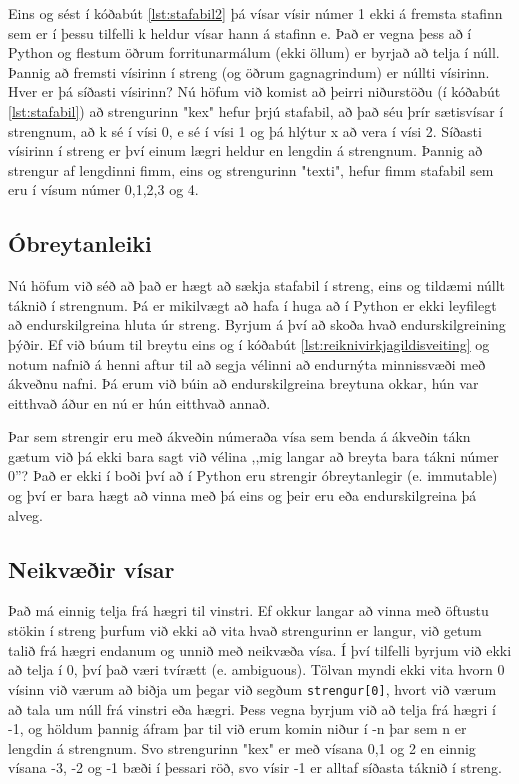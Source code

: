 Eins og sést í kóðabút \ref{lst:stafabil2} þá vísar vísir númer 1 ekki á fremsta stafinn sem er í þessu tilfelli k heldur vísar hann á stafinn e.
Það er vegna þess að í Python og flestum öðrum forritunarmálum (ekki öllum) er byrjað að telja í núll.
Þannig að fremsti vísirinn í streng (og öðrum gagnagrindum) er núllti vísirinn.
Hver er þá síðasti vísirinn?
Nú höfum við komist að þeirri niðurstöðu (í kóðabút \ref{lst:stafabil}) að strengurinn "kex" hefur þrjú stafabil, að það séu þrír sætisvísar í strengnum, að k sé í vísi 0, e sé í vísi 1 og þá hlýtur x að vera í vísi 2.
Síðasti vísirinn í streng er því einum lægri heldur en lengdin á strengnum.
Þannig að strengur af lengdinni fimm, eins og strengurinn "texti", hefur fimm stafabil sem eru í vísum númer 0,1,2,3 og 4.

\subsection{Óbreytanleiki}
Nú höfum við séð að það er hægt að sækja stafabil í streng, eins og tildæmi núllt táknið í strengnum.
Þá er mikilvægt að hafa í huga að í Python er ekki leyfilegt að endurskilgreina hluta úr streng.
Byrjum á því að skoða hvað endurskilgreining þýðir.
Ef við búum til breytu eins og í kóðabút \ref{lst:reiknivirkjagildisveiting} og notum nafnið á henni aftur til að segja vélinni að endurnýta minnissvæði með ákveðnu nafni.
Þá erum við búin að endurskilgreina breytuna okkar, hún var eitthvað áður en nú er hún eitthvað annað.

Þar sem strengir eru með ákveðin númeraða vísa sem benda á ákveðin tákn gætum við þá ekki bara sagt við vélina ,,mig langar að breyta bara tákni númer 0''?
Það er ekki í boði því að í Python eru strengir óbreytanlegir (e. immutable) og því er bara hægt að vinna með þá eins og þeir eru eða endurskilgreina þá alveg.

\subsection{Neikvæðir vísar}
Það má einnig telja frá hægri til vinstri.
Ef okkur langar að vinna með öftustu stökin í streng þurfum við ekki að vita hvað strengurinn er langur, við getum talið frá hægri endanum og unnið með neikvæða vísa.
Í því tilfelli byrjum við ekki að telja í 0, því það væri tvírætt (e. ambiguous).
Tölvan myndi ekki vita hvorn 0 vísinn við værum að biðja um þegar við segðum \texttt{strengur[0]}, hvort við værum að tala um núll frá vinstri eða hægri.
Þess vegna byrjum við að telja frá hægri í -1, og höldum þannig áfram þar til við erum komin niður í -n þar sem n er lengdin á strengnum.
Svo strengurinn "kex" er með vísana 0,1 og 2 en einnig vísana -3, -2 og -1 bæði í þessari röð, svo vísir -1 er alltaf síðasta táknið í streng.

